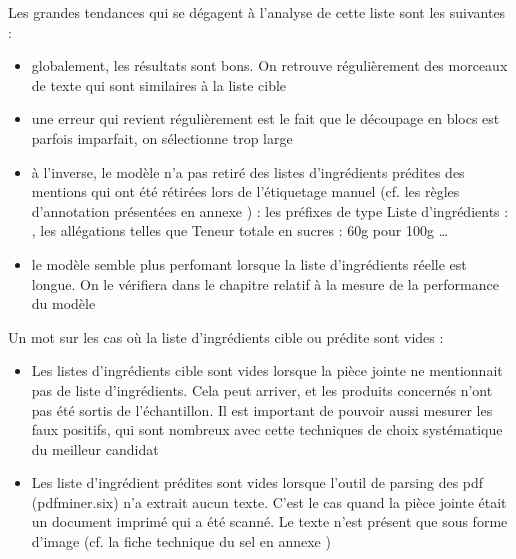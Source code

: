         Les grandes tendances qui se dégagent à l'analyse de cette liste sont les suivantes : 
        \begin{itemize}
            \item globalement, les résultats sont bons. On retrouve régulièrement des morceaux de texte qui sont similaires à la liste cible
            \item une erreur qui revient régulièrement est le fait que le découpage en blocs est parfois imparfait, on sélectionne \og trop large \fg
            \item à l'inverse, le modèle n'a pas retiré des listes d'ingrédients prédites des mentions qui ont été rétirées lors de l'étiquetage manuel (cf. les règles d'annotation présentées en annexe ) : les préfixes de type \og Liste d'ingrédients : \fg, les allégations telles que \og Teneur totale en sucres : 60g pour 100g \fg \dots
            \item le modèle semble plus perfomant lorsque la liste d'ingrédients réelle est longue. On le vérifiera dans le chapitre relatif à la mesure de la performance du modèle
        \end{itemize}

        Un mot sur les cas où la liste d'ingrédients cible ou prédite sont vides :
        \begin{itemize}
            \item Les listes d'ingrédients cible sont vides lorsque la pièce jointe ne mentionnait pas de liste d'ingrédients. Cela peut arriver, et les produits concernés n'ont pas été sortis de l'échantillon. Il est 
            important de pouvoir aussi mesurer les faux positifs, qui sont nombreux avec cette techniques de choix systématique du meilleur candidat
            \item Les liste d'ingrédient prédites sont vides lorsque l'outil de parsing des pdf (pdfminer.six) n'a extrait aucun texte. C'est le cas quand la pièce jointe était un document imprimé qui a été scanné. Le texte n'est présent que sous forme d'image (cf. la fiche technique du sel en annexe )
        \end{itemize}

        {\renewcommand{\arraystretch}{1.5}%
        \begin{spacing}{1.0}
        \begin{center}
            {\scriptsize
            
            }
        \end{center}
        \end{spacing}
        }

